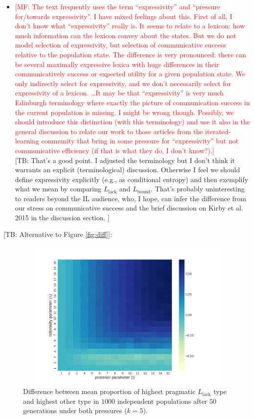 \documentclass[a4paper, 11pt]{article}
\theoremstyle{Satz}
\newcommand{\mf}[1]{\textcolor{Red}{[MF: #1]}}
\newcommand{\tb}[1]{\textcolor[rgb]{.8,.33,.0}{[TB: #1]}}%
\newcommand{\mylang}[1]{\ensuremath{L_{\text{#1}}}\xspace} %
\newcommand{\Lbound}{\mylang{bound}}
\newcommand{\Llack}{\mylang{lack}}
\begin{document}
\begin{itemize}
\item \mf{The text frequently uses the term ``expressivity'' and ``pressure for/towards
    expressivity''. I have mixed feelings about this. First of all, I don't know what
    ``expressivity'' really is. It seems to relate to a lexicon: how much information can the
    lexicon convey about the states. But we do not model selection of expressivity, but
    selection of communicative success relative to the population state. The difference is very
    pronounced: there can be several maximally expressive lexica with huge differences in their
    communicatively success or expected utility for a given population state. We only
    indirectly select for expressivity, and we don't necessarily select for expressivity of a
    lexicon. \dots It may be that ``expressivity'' is very much Edinburgh terminology where
    exactly the picture of communication success in the current population is missing. I might
    be wrong though. Possibly, we should introduce this distinction (with this terminology) and
    use it also in the general discussion to relate our work to those articles from the
    iterated-learning community that bring in some pressure for ``expressivity'' but not
    communicative efficiency (if that is what they do, I don't know?).}\\
    \tb{That's a good point. I adjusted the terminology but I don't think it warrants an explicit (terminological) discussion. Otherwise I feel we should define expressivity explicitly (e.g., as conditional entropy) and then exemplify what we mean by comparing $\Llack$ and $\Lbound$. That's probably uninteresting to readers beyond the IL audience, who, I hope, can infer the difference from our stress on communicative success and the brief discussion on Kirby et al. 2015 in the discussion section. }
\end{itemize}


\tb{Alternative to Figure \ref{fig:diff}}:

\begin{figure}[h!]
\centering
\includegraphics[width=1\textwidth,height=7.5cm,keepaspectratio]{./plots/fig4-incumbents-difference}
\caption{Difference between mean proportion of highest pragmatic $\Llack$ type and highest
  other type in $1000$ independent populations after $50$ generations under both pressures ($k
  = 5$).}
\end{figure}
\end{document}
